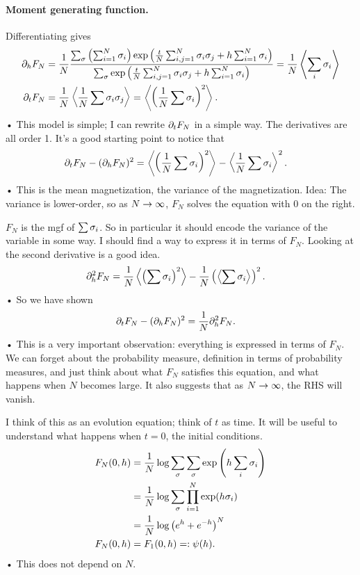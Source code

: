 \paragraph{Moment generating function.}
Differentiating gives
\begin{align}
\label{e:pd-h}
\partial_h F_N &= \frac{1}{N} \frac{\sum_\sigma \left( {\sum_{i=1}^{N} \sigma_i} \right) \exp\left( {\frac{t}{N} \sum_{i,j=1}^{N} \sigma_i\sigma_j + h\sum_{i=1}^{N} \sigma_i} \right)}{\sum_\sigma \exp\left( {\frac{t}{N} \sum_{i,j=1}^{N} \sigma_i\sigma_j + h\sum_{i=1}^{N} \sigma_i} \right)} = \frac{1}{N} \left\langle {\sum_i \sigma_i}\right\rangle\\
\partial_t F_N &= \frac{1}{N} \left\langle {\frac{1}{N}\sum \sigma_i\sigma_j}\right\rangle 
= \left\langle {\left( {\frac{1}{N} \sum \sigma_i} \right)^2}\right\rangle.
\end{align}•
This model is simple; I can rewrite $\partial_t F_N$ in a simple way. The derivatives are all order 1.
It's a good starting point to notice that
\begin{align*}
\partial_t  F_N - (\partial_hF_N)^2 &= 
\left\langle {\left( {\frac{1}{N} \sum \sigma_i} \right)^2}\right\rangle - \left\langle {\frac{1}{N} \sum \sigma_i}\right\rangle^2.
\end{align*}•
This is the mean magnetization, the variance of the magnetization.
Idea: The variance is lower-order, so as $N\to \infty$, $F_N$ solves the equation with 0 on the right.

$F_N$ is the mgf of $\sum\sigma_i$. So in particular it should encode the variance of the variable in some way. I should find a way to express it in terms of $F_N$. Looking at the second derivative is a good idea.
\begin{align*}
\partial_h^2 F_N &= \frac{1}{N} \left\langle {\left( {\sum \sigma_i} \right)^2}\right\rangle - \frac{1}{N}\left( { \left\langle {\sum \sigma_i}\right\rangle} \right)^2.
\end{align*}•
So we have shown
\begin{align}
\partial_t F_N - (\partial_h F_N)^2 &= \frac{1}{N} \partial_h^2 F_N.
\label{e:pde1}
\end{align}•
This is a very important observation: everything is expressed in terms of $F_N$. We can forget about the probability measure, definition in terms of probability measures, and just think about what $F_N$ satisfies this equation, and what happens when $N$ becomes large. It also suggests that as $N\to \infty$, the RHS will vanish.

I think of this as an evolution equation; think of $t$ as time. It will be useful to understand what happens when $t=0$, the initial conditions.
\begin{align}
F_N(0,h) &= \frac{1}{N} \log \sum_\sigma \sum_\sigma \exp\left( {h \sum_i \sigma_i} \right)\\
&= \frac{1}{N} \log \sum_\sigma \prod_{i=1}^{N} \exp(h\sigma_i)\\
&= \frac{1}{N} \log \left( {e^h+e^{-h}} \right)^N\\
F_N(0,h) &= F_1(0,h) =: \psi(h).
\label{e:pde2}
\end{align}•
This does not depend on $N$.


